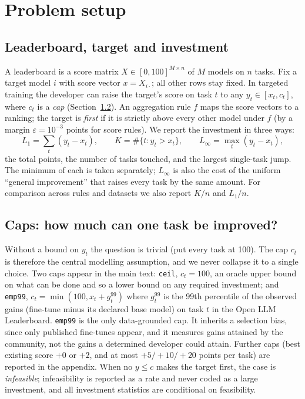 \documentclass{article}
\begin{document}
\section{Problem setup}
\label{sec:setup}
\subsection{Leaderboard, target and investment}
A leaderboard is a score matrix $X\in[0,100]^{M\times n}$ of $M$ models on $n$ tasks. Fix a target model $i$ with score vector $x=X_{i\cdot}$; all other rows stay fixed. In targeted training the developer can raise the target's score on task $t$ to any $y_t\in[x_t,c_t]$, where $c_t$ is a \emph{cap} (Section~\ref{sec:caps}). An aggregation rule $f$ maps the score vectors to a ranking; the target is \emph{first} if it is strictly above every other model under $f$ (by a margin $\varepsilon=10^{-3}$ points for score rules). We report the investment in three ways:
\[
L_1=\sum_t (y_t-x_t),\qquad K=\#\{t: y_t>x_t\},\qquad L_\infty=\max_t (y_t-x_t),
\]
the total points, the number of tasks touched, and the largest single-task jump. The minimum of each is taken separately; $L_\infty$ is also the cost of the uniform ``general improvement'' that raises every task by the same amount. For comparison across rules and datasets we also report $K/n$ and $L_1/n$.

\subsection{Caps: how much can one task be improved?}
\label{sec:caps}
Without a bound on $y_t$ the question is trivial (put every task at 100). The cap $c_t$ is therefore the central modelling assumption, and we never collapse it to a single choice. Two caps appear in the main text: \texttt{ceil}, $c_t=100$, an oracle upper bound on what can be done and so a lower bound on any required investment; and \texttt{emp99}, $c_t=\min(100,x_t+g_t^{99})$ where $g_t^{99}$ is the 99th percentile of the observed gains (fine-tune minus its declared base model) on task $t$ in the Open LLM Leaderboard. \texttt{emp99} is the only data-grounded cap. It inherits a selection bias, since only published fine-tunes appear, and it measures gains attained by the community, not the gains a determined developer could attain. Further caps (best existing score $+0$ or $+2$, and at most $+5/+10/+20$ points per task) are reported in the appendix. When no $y\le c$ makes the target first, the case is \emph{infeasible}; infeasibility is reported as a rate and never coded as a large investment, and all investment statistics are conditional on feasibility.
\end{document}
